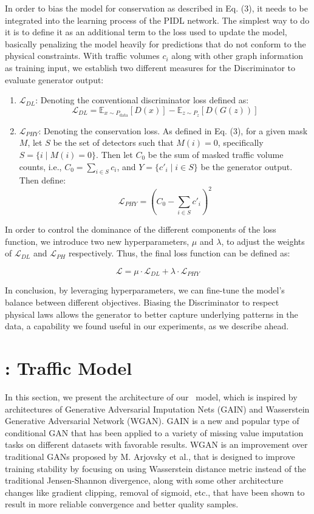 In order to bias the model for conservation as described in Eq. (3), it needs to be integrated into the learning process of the PIDL network. The simplest way to do it is to define it as an additional term to the loss used to update the model, basically penalizing the model heavily for predictions that do not conform to the physical constraints. With traffic volumes \(c_i\) along with other graph information as training input, we establish two different measures for the Discriminator to evaluate generator output:
\begin{enumerate}
    \item \textbf{\( \mathcal{L}_{DL} \)}: Denoting the conventional discriminator loss defined as:
    \[ \mathcal{L}_{DL} = \mathbb{E}_{x \sim P_{\text{data}}}[D(x)] - \mathbb{E}_{z \sim P_z}[D(G(z))] \]

    \item \textbf{\( \mathcal{L}_{PHY} \)}: Denoting the conservation loss. As defined in Eq. (3), for a given mask \( M \), let \( S \) be the set of detectors such that \( M(i) = 0 \), specifically \( S = \{i \mid M(i) = 0\} \). Then let \( C_0 \) be the sum of masked traffic volume counts, i.e., \( C_0 = \sum_{i \in S} c_i \), and \( Y = \{c'_i \mid i \in S\} \) be the generator output. Then define:
    \[ \mathcal{L}_{PHY} = (C_0 - \sum_{i \in S} c'_i)^2 \]
\end{enumerate}
In order to control the dominance of the different components of the loss function, we introduce two new hyperparameters, \( \mu \) and \( \lambda \), to adjust the weights of \( \mathcal{L}_{DL} \) and \( \mathcal{L}_{PH} \) respectively. Thus, the final loss function can be defined as:

\[ \mathcal{L} = \mu \cdot \mathcal{L}_{DL} + \lambda \cdot \mathcal{L}_{PHY} \]

In conclusion, by leveraging hyperparameters, we can fine-tune the model's balance between different objectives. Biasing the Discriminator to respect physical laws allows the generator to better capture underlying patterns in the data, a capability we found useful in our experiments, as we describe ahead.

\section{\modelname: Traffic Model}

In this section, we present the architecture of our \modelname\ model, which is inspired by architectures of Generative Adversarial Imputation Nets (GAIN)\cite{gain} and Wasserstein Generative Adversarial Network (WGAN)\cite{wgan}. GAIN is a new and popular type of conditional GAN that has been applied to a variety of missing value imputation tasks on different datasets with favorable results. WGAN is an improvement over traditional GANs proposed by M. Arjovsky et al., that is designed to improve training stability by focusing on using Wasserstein distance metric instead of the traditional Jensen-Shannon divergence, along with some other architecture changes like gradient clipping, removal of sigmoid, etc., that have been shown to result in more reliable convergence and better quality samples.


